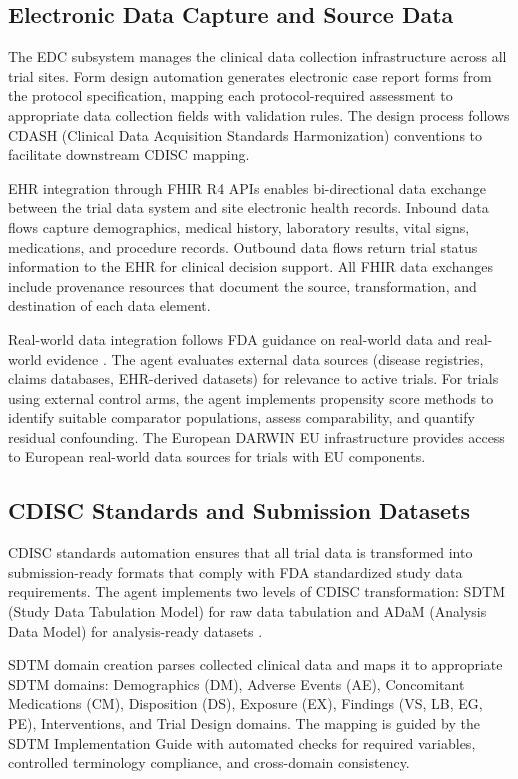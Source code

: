\subsection{Electronic Data Capture and Source Data}

The EDC subsystem manages the clinical data collection infrastructure across all trial
sites. Form design automation generates electronic case report forms from the protocol
specification, mapping each protocol-required assessment to appropriate data collection
fields with validation rules. The design process follows CDASH (Clinical Data Acquisition
Standards Harmonization) conventions to facilitate downstream CDISC mapping.

EHR integration through FHIR R4 APIs enables bi-directional data exchange between the
trial data system and site electronic health records. Inbound data flows capture
demographics, medical history, laboratory results, vital signs, medications, and
procedure records. Outbound data flows return trial status information to the EHR for
clinical decision support. All FHIR data exchanges include provenance resources that
document the source, transformation, and destination of each data element.

Real-world data integration follows FDA guidance on real-world data and real-world
evidence \cite{fda-rwd-registries}. The agent evaluates external data sources (disease
registries, claims databases, EHR-derived datasets) for relevance to active trials.
For trials using external control arms, the agent implements propensity score methods
to identify suitable comparator populations, assess comparability, and quantify
residual confounding. The European DARWIN EU infrastructure provides access to
European real-world data sources for trials with EU components.

\subsection{CDISC Standards and Submission Datasets}

CDISC standards automation ensures that all trial data is transformed into
submission-ready formats that comply with FDA standardized study data requirements. The
agent implements two levels of CDISC transformation: SDTM (Study Data Tabulation Model)
for raw data tabulation and ADaM (Analysis Data Model) for analysis-ready datasets
\cite{cdisc-sdtm, cdisc-adam}.

SDTM domain creation parses collected clinical data and maps it to appropriate SDTM
domains: Demographics (DM), Adverse Events (AE), Concomitant Medications (CM),
Disposition (DS), Exposure (EX), Findings (VS, LB, EG, PE), Interventions, and
Trial Design domains. The mapping is guided by the SDTM Implementation Guide with
automated checks for required variables, controlled terminology compliance, and
cross-domain consistency.

